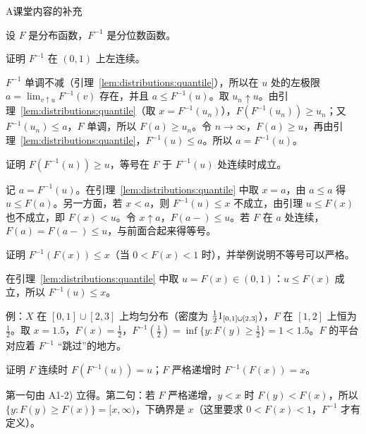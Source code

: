 \begin{exercises}{A}{课堂内容的补充}
\item\label{ex:distributions:A1} 设 $F$ 是分布函数，$F^{-1}$ 是分位数函数。
\begin{questions}
\item 证明 $F^{-1}$ 在 $(0,1)$ 上左连续。
\begin{solution}
$F^{-1}$ 单调不减（引理~\ref{lem:distributions:quantile}），所以在 $u$ 处的左极限 $a=\lim_{v\uparrow u}F^{-1}(v)$ 存在，并且 $a\leqslant F^{-1}(u)$。取 $u_n\uparrow u$。由引理~\ref{lem:distributions:quantile}（取 $x=F^{-1}(u_n)$），$F(F^{-1}(u_n))\geqslant u_n$；又 $F^{-1}(u_n)\leqslant a$，$F$ 单调，所以 $F(a)\geqslant u_n$。令 $n\to\infty$，$F(a)\geqslant u$，再由引理~\ref{lem:distributions:quantile}，$F^{-1}(u)\leqslant a$。所以 $a=F^{-1}(u)$。
\end{solution}
\item 证明 $F(F^{-1}(u))\geqslant u$，等号在 $F$ 于 $F^{-1}(u)$ 处连续时成立。
\begin{solution}
记 $a=F^{-1}(u)$。在引理~\ref{lem:distributions:quantile} 中取 $x=a$，由 $a\leqslant a$ 得 $u\leqslant F(a)$。另一方面，若 $x<a$，则 $F^{-1}(u)\leqslant x$ 不成立，由引理 $u\leqslant F(x)$ 也不成立，即 $F(x)<u$。令 $x\uparrow a$，$F(a-)\leqslant u$。若 $F$ 在 $a$ 处连续，$F(a)=F(a-)\leqslant u$，与前面合起来得等号。
\end{solution}
\item 证明 $F^{-1}(F(x))\leqslant x$（当 $0<F(x)<1$ 时），并举例说明不等号可以严格。
\begin{solution}
在引理~\ref{lem:distributions:quantile} 中取 $u=F(x)\in(0,1)$：$u\leqslant F(x)$ 成立，所以 $F^{-1}(u)\leqslant x$。

例：$X$ 在 $[0,1]\cup[2,3]$ 上均匀分布（密度为 $\frac121_{[0,1]\cup[2,3]}$），$F$ 在 $[1,2]$ 上恒为 $\frac12$。取 $x=1.5$，$F(x)=\frac12$，$F^{-1}(\frac12)=\inf\{y:F(y)\geqslant\frac12\}=1<1.5$。$F$ 的平台对应着 $F^{-1}$ “跳过”的地方。
\end{solution}
\item 证明 $F$ 连续时 $F(F^{-1}(u))=u$；$F$ 严格递增时 $F^{-1}(F(x))=x$。
\begin{solution}
第一句由 A1-2) 立得。第二句：若 $F$ 严格递增，$y<x$ 时 $F(y)<F(x)$，所以 $\{y:F(y)\geqslant F(x)\}=[x,\infty)$，下确界是 $x$（这里要求 $0<F(x)<1$，$F^{-1}$ 才有定义）。
\end{solution}
\end{questions}


\end{exercises}
